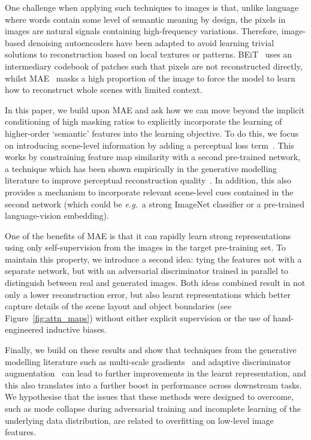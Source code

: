 \documentclass[10pt,twocolumn,letterpaper, cta-author]{article}
\begin{document}
One challenge when applying such techniques to images is that, unlike language where words contain some level of semantic meaning by design, the pixels in images are natural signals containing high-frequency variations. Therefore, image-based denoising autoencoders have been adapted to avoid learning trivial solutions to reconstruction based on local textures or patterns. BEiT~\cite{bao2022beit} uses an intermediary codebook of patches such that pixels are not reconstructed directly, whilst MAE~\cite{MaskedAutoencoders2021} masks a high proportion of the image to force the model to learn how to reconstruct whole scenes with limited context.

In this paper, we build upon MAE and ask how we can move beyond the implicit conditioning of high masking ratios to explicitly incorporate the learning of higher-order `semantic' features into the learning objective. To do this, we focus on introducing scene-level information by adding a perceptual loss term~\cite{Johnson2016Perceptual}. This works by constraining feature map similarity with a second pre-trained network, a technique which has been shown empirically in the generative modelling literature to improve perceptual reconstruction quality~\cite{zhang2018perceptual}. In addition, this also provides a mechanism to incorporate relevant scene-level cues contained in the second network (which could be \emph{e.g.}\ a strong ImageNet classifier or a pre-trained language-vision embedding).

One of the benefits of MAE is that it can rapidly learn strong representations using only self-supervision from the images in the target pre-training set. To maintain this property, we introduce a second idea: tying the features not with a separate network, but with an adversarial discriminator trained in parallel to distinguish between real and generated images. Both ideas combined result in not only a lower reconstruction error, but also learnt representations which better capture details of the scene layout and object boundaries (see Figure~\ref{fig:attn_maps}) without either explicit supervision or the use of hand-engineered inductive biases.

Finally, we build on these results and show that techniques from the generative modelling literature such as multi-scale gradients~\cite{progressive_gans} and adaptive discriminator augmentation~\cite{Karras2020ada} can lead to further improvements in the learnt representation, and this also translates into a further boost in performance across downstream tasks. We hypothesise that the issues that these methods were designed to overcome, such as mode collapse during adversarial training and incomplete learning of the underlying data distribution, are related to overfitting on low-level image features.
\end{document}
